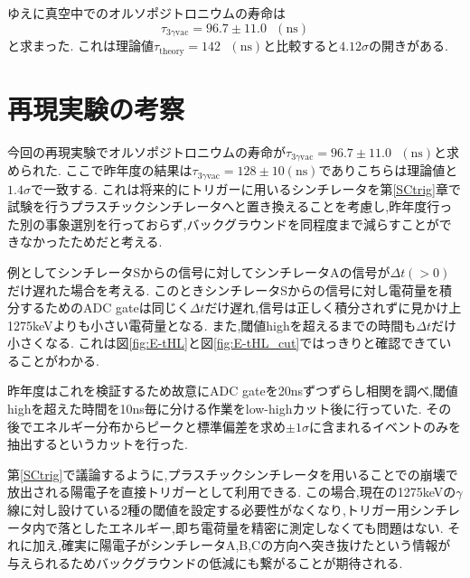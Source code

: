 ゆえに真空中でのオルソポジトロニウムの寿命は
\begin{equation}
	\nonumber
	\tau_{3\gamma\textrm{vac}}=96.7 \pm 11.0\hspace{8pt}(\textrm{ns})
\end{equation}
と求まった.
これは理論値$\tau_\textrm{theory}=142\hspace{8pt}(\textrm{ns})$と比較すると$4.12\sigma$の開きがある.

\section{再現実験の考察}
今回の再現実験でオルソポジトロニウムの寿命が$\tau_{3\gamma\textrm{vac}}=96.7 \pm 11.0\hspace{8pt}(\textrm{ns})$と求められた.
ここで昨年度の結果は$\tau_{3\gamma\textrm{vac}}=128 \pm 10(\textrm{ns})$でありこちらは理論値と$1.4\sigma$で一致する.
これは将来的にトリガーに用いるシンチレータを第\ref{SCtrig}章で試験を行うプラスチックシンチレータへと置き換えることを考慮し,昨年度行った別の事象選別を行っておらず,バックグラウンドを同程度まで減らすことができなかったためだと考える.\newline

例としてシンチレータSからの信号に対してシンチレータAの信号が$\Delta t(>0)$だけ遅れた場合を考える.
このときシンチレータSからの信号に対し電荷量を積分するためのADC gateは同じく$\Delta t$だけ遅れ,信号は正しく積分されずに見かけ上1275keVよりも小さい電荷量となる.
また,閾値highを超えるまでの時間も$\Delta t$だけ小さくなる.%
これは図\ref{fig:E-tHL}と図\ref{fig:E-tHL_cut}ではっきりと確認できていることがわかる.

昨年度はこれを検証するため故意にADC gateを20nsずつずらし相関を調べ,閾値highを超えた時間を10ns毎に分ける作業をlow-highカット後に行っていた.
その後でエネルギー分布からピークと標準偏差を求め$\pm 1\sigma$に含まれるイベントのみを抽出するというカットを行った.~\cite{卒業論文2015}

第\ref{SCtrig}で議論するように,プラスチックシンチレータを用いることでの崩壊で放出される陽電子を直接トリガーとして利用できる.
この場合,現在の1275keVの$\gamma$線に対し設けている2種の閾値を設定する必要性がなくなり,トリガー用シンチレータ内で落としたエネルギー,即ち電荷量を精密に測定しなくても問題はない.
それに加え,確実に陽電子がシンチレータA,B,Cの方向へ突き抜けたという情報が与えられるためバックグラウンドの低減にも繋がることが期待される.
